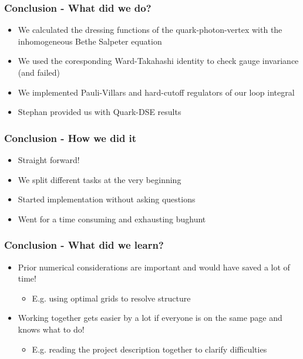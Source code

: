 \begin{frame}
	\frametitle{Conclusion - What did we do?}
			\begin{itemize}
				\item We calculated the dressing functions of the quark-photon-vertex with the inhomogeneous Bethe Salpeter equation
					\vspace{2mm}
				\item We used the coresponding Ward-Takahashi identity to check gauge invariance (and failed)
					\vspace{2mm}
				\item We implemented Pauli-Villars and hard-cutoff regulators of our loop integral 
					\vspace{2mm}
				\item Stephan provided us with Quark-DSE results
			\end{itemize}
\end{frame}

\begin{frame}
	\frametitle{Conclusion - How we did it} 
			\begin{itemize}
				\item Straight forward!
					\vspace{2mm}
				\item We split different tasks at the very beginning
					\vspace{2mm}
				\item Started implementation without asking questions
					\vspace{2mm}
				\item Went for a time consuming and exhausting bughunt
			\end{itemize}
\end{frame}


\begin{frame}
    \frametitle{Conclusion - What did we learn?}
    \begin{itemize}
        \item Prior numerical considerations are important and would have saved a lot of time!
        	\begin{itemize}
        		\item E.g. using optimal grids to resolve structure
        	\end{itemize}
        		\vspace{3mm}
        \item Working together gets easier by a lot if everyone is on the same page and knows what to do!
        	\begin{itemize}
                \item E.g. reading the project description together to clarify difficulties
        	\end{itemize}
    \end{itemize}
\end{frame}
